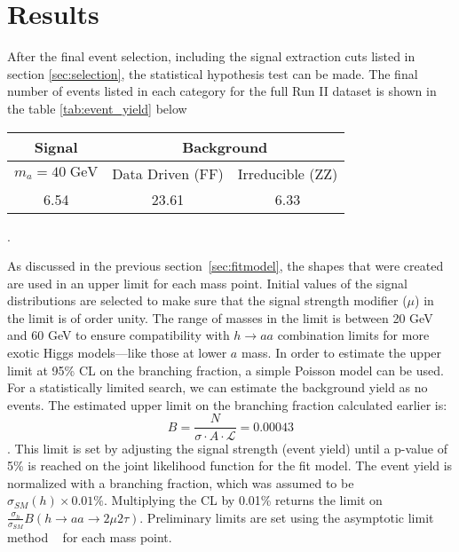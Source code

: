 
\section{Results}
\label{sec:res}
After the final event selection, including the signal extraction cuts listed in section \ref{sec:selection}, the statistical hypothesis test can be made. 
The final number of events listed in each category for the full Run II dataset is shown in the table \ref{tab:event_yield} below


\begin{table}[h!tbp]
\centering
{}
\begin{tabular*}{0.6\textwidth}{c|c|c}
\hline
Signal & \multicolumn{2}{c}{Background} \\
\hline $m_a=40\;\text{GeV}$ & Data Driven (FF) & Irreducible (ZZ)\\\hline
6.54   & 23.61 & 6.33 \\\hline
\end{tabular*}
\end{table}.
 



As discussed in the previous section~\ref{sec:fitmodel}, the shapes that were created are used in an upper limit for each mass point. 
Initial values of the signal distributions are selected to make sure that the signal strength modifier ($\mu$) in the limit is of order unity. 
The range of masses in the limit is between 20 GeV and 60 GeV to ensure compatibility with $h \rightarrow a a $ combination limits for more exotic Higgs models---like those at lower $a$ mass. 
In order to estimate the upper limit at 95\% CL on the branching fraction, a simple Poisson model can be used. For a statistically limited search, we can estimate the background yield as no events. The estimated upper limit on the branching fraction calculated earlier is: 
\begin{equation}B =  \frac{N}{\sigma \cdot A\cdot \mathcal{L}} = 0.00043\end{equation}. 
This limit is set by adjusting the signal strength (event yield) until a p-value of 5\% is reached on the joint likelihood function for the fit model. 
The event yield is normalized with a branching fraction, which was assumed to be $\sigma_{SM}(h) \times 0.01\%$.
Multiplying the CL by 0.01\% returns the limit on $\frac{\sigma_h}{\sigma_{SM}} B(h\rightarrow aa\rightarrow2\mu2\tau)$.
Preliminary limits are set using the asymptotic limit method ~\cite{Cowan_2011} for each mass point.


